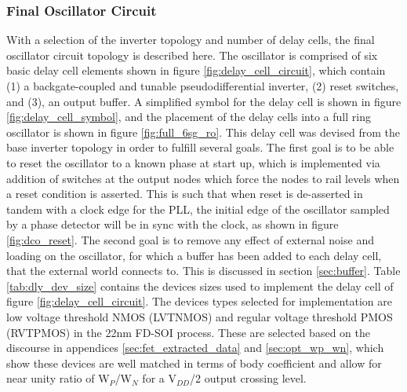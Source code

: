 	\subsubsection{Final Oscillator Circuit}
	\FloatBarrier
	With a selection of the inverter topology and number of delay cells, the final oscillator circuit topology is described here. The oscillator is comprised of six basic delay cell elements shown in figure \ref{fig:delay_cell_circuit}, which contain (1) a backgate-coupled and tunable pseudodifferential inverter, (2) reset switches, and (3), an output buffer. A simplified symbol for the delay cell is shown in figure \ref{fig:delay_cell_symbol}, and the placement of the delay cells into a full ring oscillator is shown in figure \ref{fig:full_6sg_ro}. This delay cell was devised from the base inverter topology in order to fulfill several goals. The first goal is to be able to reset the oscillator to a known phase at start up, which is implemented via addition of switches at the output nodes which force the nodes to rail levels when a reset condition is asserted. This is such that when reset is de-asserted in tandem with a clock edge for the PLL, the initial edge of the oscillator sampled by a phase detector will be in sync with the clock, as shown in figure \ref{fig:dco_reset}. The second goal is to remove any effect of external noise and loading on the oscillator, for which a buffer has been added to each delay cell, that the external world connects to. This is discussed in section \ref{sec:buffer}. Table \ref{tab:dly_dev_size} contains the devices sizes used to implement the delay cell of figure \ref{fig:delay_cell_circuit}. The devices types selected for implementation are low voltage threshold NMOS (LVTNMOS) and regular voltage threshold PMOS (RVTPMOS) in the 22nm FD-SOI process. These are selected based on the discourse in appendices \ref{sec:fet_extracted_data} and \ref{sec:opt_wp_wn}, which show these devices are well matched in terms of body coefficient and allow for near unity ratio of W$_P$/W$_N$ for a V$_{DD}$/2 output crossing level.
	\vspace{-2em}
